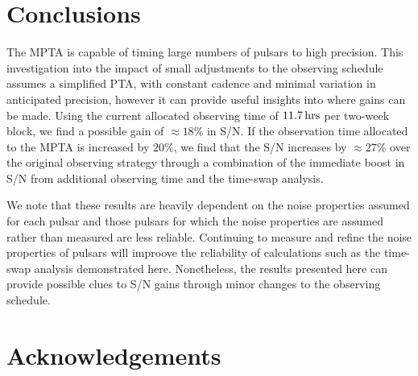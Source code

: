 \documentclass[fleqn,usenatbib]{mnras}
\newcommand{\TwoWkObsTimeHrs}{11.7}
\begin{document}
\section{Conclusions}
\label{sec:conclusions}

The MPTA is capable of timing large numbers of pulsars to high precision. 
This investigation into the impact of small adjustments to the observing schedule assumes a simplified PTA, with constant cadence and minimal variation in anticipated precision, however it can provide useful insights into where gains can be made. 
Using the current allocated observing time of $\TwoWkObsTimeHrs\,{\rm hrs}$ per two-week block, we find a possible gain of $\approx 18\%$ in S/N. 
If the observation time allocated to the MPTA is increased by $20\%$, we find that the S/N increases by $\approx 27\%$ over the original observing strategy through a combination of the immediate boost in S/N from additional observing time and the time-swap analysis. 

We note that these results are heavily dependent on the noise properties assumed for each pulsar and those pulsars for which the noise properties are assumed rather than measured are less reliable. 
Continuing to measure and refine the noise properties of pulsars will improove the reliability of calculations such as the time-swap analysis demonstrated here.
Nonetheless, the results presented here can provide possible clues to S/N gains through minor changes to the observing schedule. 


\section*{Acknowledgements}
\end{document}
